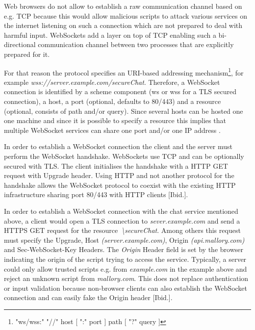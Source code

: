 Web browsers do not allow to establish a raw communication channel based on e.g. TCP because this would allow malicious scripts to attack various services on the internet listening on such a connection which are not prepared to deal with harmful input. WebSockets add a layer on top of TCP enabling such a bi-directional communication channel between two processes that are explicitly prepared for it. 

For that reason the protocol specifies an URI-based addressing mechanism\footnote{"ws/wss:" "//" host [ ":" port ] path [ "?" query ]}, for example \textit{wss://server.example.com/secureChat}. Therefore, a WebSocket connection is identified by a scheme component (ws or wss for a TLS secured connection), a host, a port (optional, defaults to 80/443) and a resource (optional, consists of path and/or query). Since several hosts can be hosted one one machine and since it is possible to specify a resource this implies that multiple WebSocket services can share one port and/or one IP address \cite{websocket}. 

In order to establish a WebSocket connection the client and the server must perform the WebSocket handshake. WebSockets use TCP and can be optionally secured with TLS. The client initialises the handshake with a HTTP GET request with Upgrade header. Using HTTP and not another protocol for the handshake allows the WebSocket protocol to coexist with the existing HTTP infrastructure sharing port 80/443 with HTTP clients [Ibid.]. 

In order to establish a WebSocket connection with the chat service mentioned above, a client would open a TLS connection to \textit{sever.example.com} and send a HTTPS GET request for the resource~\textit{\textbackslash secureChat}. Among others this request must specify the Upgrade, Host \textit{(server.example.com)}, Origin \textit{(api.mallory.com)} and Sec-WebSocket-Key Headers. The \textit{Origin} Header field is set by the browser indicating the origin of the script trying to access the service. Typically, a server could only allow trusted scripts e.g. from \textit{example.com} in the example above and reject an unknown script from \textit{mallory.com}. This does not replace authentication or input validation because non-browser clients can also establish the WebSocket connection and can easily fake the Origin header [Ibid.]. 

